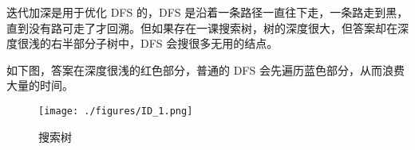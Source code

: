 
迭代加深是用于优化 DFS 的，DFS 是沿着一条路径一直往下走，一条路走到黑，直到没有路可走了才回溯。但如果存在一课搜索树，树的深度很大，但答案却在深度很浅的右半部分子树中，DFS 会搜很多无用的结点。

如下图，答案在深度很浅的红色部分，普通的 DFS 会先遍历蓝色部分，从而浪费大量的时间。

\begin{figure}[ht]
\centering
\texttt{[image: ./figures/ID\_1.png]}
\caption{搜索树} \label{ID_fig1}
\end{figure}

